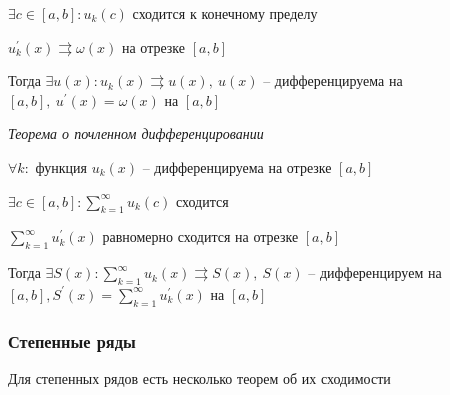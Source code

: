 \documentclass{article}
\begin{document}
\begin{enumerate}
		$\exists c \in [a, b]: u_k(c)$ сходится к конечному пределу
		
		$u_k^{\prime}(x)  \rightrightarrows \omega(x)$ на отрезке $[a, b]$
		
		Тогда $\exists u(x): u_k(x) \rightrightarrows u(x),\ u(x)$ -- дифференцируема на $[a, b],\ u^{\prime}(x) = \omega(x)$ на $[a, b]$
		
		{\it Теорема о почленном дифференцировании}
		
		$\forall k:$ функция $u_k(x)$ -- дифференцируема на отрезке $[a, b]$
		
		$\exists c \in [a, b]: \sum\limits_{k=1}^{\infty} u_k(c)$ сходится
		
		$\sum\limits_{k=1}^{\infty}u_k^{\prime}(x)$ равномерно сходится на отрезке $[a, b]$
		
		Тогда $\exists S(x): \sum\limits_{k=1}^{\infty}u_k(x) \rightrightarrows S(x),\ S(x)$ -- дифференцируем на $[a, b], S^{\prime}(x) = \sum\limits_{k=1}^{\infty}u_k^{\prime}(x)$ на $[a, b]$
		
	\end{enumerate}
	
	\subsubsection{Степенные ряды}
	
	
	Для степенных рядов есть несколько теорем об их сходимости
	
\end{document}
